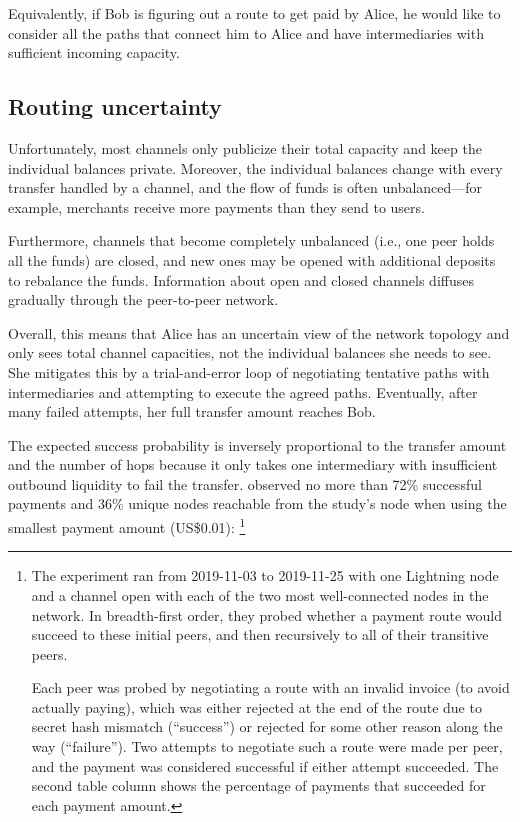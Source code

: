 \documentclass[11pt,a4paper,oneside]{article}
\begin{document}
\begin{multicols}{2}
Equivalently, if Bob is figuring out a route to get paid by Alice, he would like to consider all the paths that connect him to Alice and have intermediaries with sufficient incoming capacity.

\subsection{Routing uncertainty}%
\label{h:lightning-routing-uncertainty}

Unfortunately, most channels only publicize their total capacity and keep the individual balances private.
Moreover, the individual balances change with every transfer handled by a channel, and the flow of funds is often unbalanced---for example, merchants receive more payments than they send to users.

Furthermore, channels that become completely unbalanced (i.e., one peer holds all the funds) are closed, and new ones may be opened with additional deposits to rebalance the funds.
Information about open and closed channels diffuses gradually through the peer-to-peer network.

Overall, this means that Alice has an uncertain view of the network topology and only sees total channel capacities, not the individual balances she needs to see.
She mitigates this by a trial-and-error loop of negotiating tentative paths with intermediaries and attempting to execute the agreed paths.
Eventually, after many failed attempts, her full transfer amount reaches Bob.

The expected success probability is inversely proportional to the transfer amount and the number of hops because it only takes one intermediary with insufficient outbound liquidity to fail the transfer.
 \citet{WaughHolzEmpiricalStudyAvailability2020} observed no more than 72\% successful payments and 36\% unique nodes reachable from the study's node when using the smallest payment amount (US\$0.01):%
\footnote{The experiment ran from 2019-11-03 to 2019-11-25 with one Lightning node and a channel open with each of the two most well-connected nodes in the network.
  In breadth-first order, they probed whether a payment route would succeed to these initial peers, and then recursively to all of their transitive peers.

  Each peer was probed by negotiating a route with an invalid invoice (to avoid actually paying), which was either rejected at the end of the route due to secret hash mismatch (``success'') or rejected for some other reason along the way (``failure'').
  Two attempts to negotiate such a route were made per peer, and the payment was considered successful if either attempt succeeded.
  The second table column shows the percentage of payments that succeeded for each payment amount.

}
\end{multicols}
\end{document}
